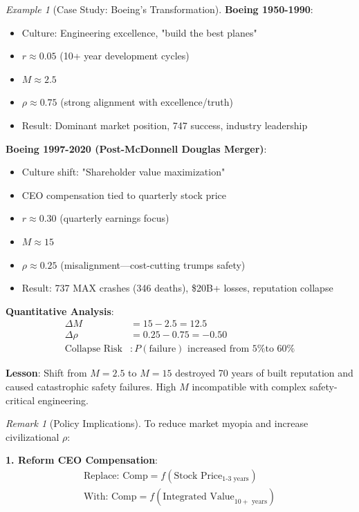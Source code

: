 \documentclass[11pt,a4paper]{article}
\theoremstyle{definition}
\theoremstyle{remark}
\newtheorem{remark}{Remark}[section]
\newtheorem{example}{Example}[section]
\begin{document}
\begin{enumerate}
\begin{example}[Case Study: Boeing's Transformation]
\textbf{Boeing 1950-1990}:
\begin{itemize}
    \item Culture: Engineering excellence, "build the best planes"
    \item \(r \approx 0.05\) (10+ year development cycles)
    \item \(M \approx 2.5\)
    \item \(\rho \approx 0.75\) (strong alignment with excellence/truth)
    \item Result: Dominant market position, 747 success, industry leadership
\end{itemize}

\textbf{Boeing 1997-2020 (Post-McDonnell Douglas Merger)}:
\begin{itemize}
    \item Culture shift: "Shareholder value maximization"
    \item CEO compensation tied to quarterly stock price
    \item \(r \approx 0.30\) (quarterly earnings focus)
    \item \(M \approx 15\)
    \item \(\rho \approx 0.25\) (misalignment—cost-cutting trumps safety)
    \item Result: 737 MAX crashes (346 deaths), \$20B+ losses, reputation collapse
\end{itemize}

\textbf{Quantitative Analysis}:
\begin{align}
\Delta M &= 15 - 2.5 = 12.5 \\
\Delta \rho &= 0.25 - 0.75 = -0.50 \\
\text{Collapse Risk} &: P(\text{failure}) \text{ increased from 5\% to 60\%}
\end{align}

\textbf{Lesson}: Shift from \(M = 2.5\) to \(M = 15\) destroyed 70 years of built reputation and caused catastrophic safety failures. High \(M\) incompatible with complex safety-critical engineering.
\end{example}

\begin{remark}[Policy Implications]
To reduce market myopia and increase civilizational \(\rho\):

\textbf{1. Reform CEO Compensation}:
\begin{align}
\text{Replace: } \text{Comp} = f(\text{Stock Price}_{\text{1-3 years}}) \\
\text{With: } \text{Comp} = f(\text{Integrated Value}_{10+ \text{ years}})
\end{align}


\end{remark}
\end{enumerate}
\end{document}
